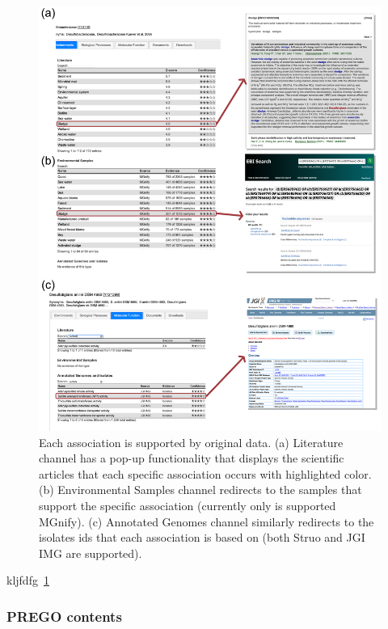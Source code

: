\begin{figure}[h]
   \label{fig:prego_ui_resources}
   \centering
   \includegraphics[width=0.98\columnwidth]{figures/prego_ui_resources.png}
   \caption{ 
      Each association is supported by original data. 
      (a) Literature channel has a pop-up functionality that displays the scientific articles that each specific association occurs with highlighted color. 
      (b) Environmental Samples channel redirects to the samples that support the specific association (currently only is supported MGnify). 
      (c) Annotated Genomes channel similarly redirects to the isolates ids that each association is based on (both Struo and JGI IMG are supported).
   }
\end{figure}



kljfdfg~\ref{fig:prego_ui_resources}





   \subsubsection*{PREGO contents}



